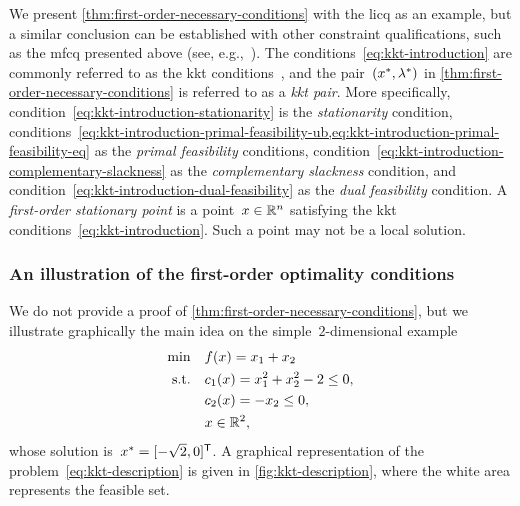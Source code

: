We present \cref{thm:first-order-necessary-conditions} with the \gls{licq} as an example, but a similar conclusion can be established with other constraint qualifications, such as the \gls{mfcq} presented above (see, e.g.,~\cite[p.~339]{Nocedal_Wright_2006}).
The conditions~\cref{eq:kkt-introduction} are commonly referred to as the \gls{kkt} conditions~\cite{Karush_1939,Kuhn_Tucker_1951}, and the pair~$(\iter[\ast], \lm[\ast])$ in \cref{thm:first-order-necessary-conditions} is referred to as a \emph{\gls{kkt} pair}.
More specifically, condition~\cref{eq:kkt-introduction-stationarity} is the \emph{stationarity} condition, conditions~\cref{eq:kkt-introduction-primal-feasibility-ub,eq:kkt-introduction-primal-feasibility-eq} as the \emph{primal feasibility} conditions, condition~\cref{eq:kkt-introduction-complementary-slackness} as the \emph{complementary slackness} condition, and condition~\cref{eq:kkt-introduction-dual-feasibility} as the \emph{dual feasibility} condition.
A \emph{first-order stationary point} is a point~$\iter \in \R^n$ satisfying the \gls{kkt} conditions~\cref{eq:kkt-introduction}.
Such a point may not be a local solution.

\subsubsection{An illustration of the first-order optimality conditions}

We do not provide a proof of \cref{thm:first-order-necessary-conditions}, but we illustrate graphically the main idea on the simple~$2$-dimensional example
\begin{subequations}
    \label{eq:kkt-description}
    \begin{align}
        \min        & \quad \obj(\iter) = x_1 + x_2\\
        \text{s.t.} & \quad \con{1}(\iter) = x_1^2 + x_2^2 - 2 \le 0, \label{eq:kkt-description-c1}\\
                    & \quad \con{2}(\iter) = -x_2 \le 0, \label{eq:kkt-description-c2}\\
                    & \quad \iter \in \R^2, \nonumber
    \end{align}
\end{subequations}
whose solution is~$\iter[\ast] = [-\sqrt{2}, 0]^{\T}$.
A graphical representation of the problem~\cref{eq:kkt-description} is given in \cref{fig:kkt-description}, where the white area represents the feasible set.

